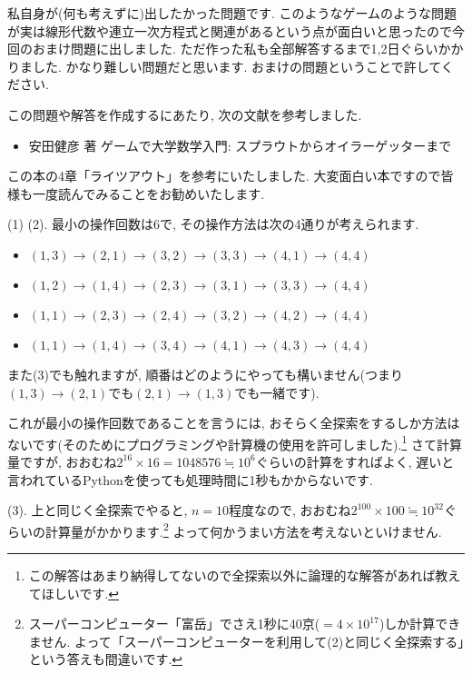 \documentclass[dvipdfmx,a4paper,11pt]{article}
\theoremstyle{definition}
\begin{document}
私自身が(何も考えずに)出したかった問題です. このようなゲームのような問題が実は線形代数や連立一次方程式と関連があるという点が面白いと思ったので今回のおまけ問題に出しました.  ただ作った私も全部解答するまで1,2日ぐらいかかりました. かなり難しい問題だと思います. おまけの問題ということで許してください.

この問題や解答を作成するにあたり, 次の文献を参考しました.
\begin{itemize}
\item 安田健彦 著  ゲームで大学数学入門: スプラウトからオイラーゲッターまで
\end{itemize}
この本の4章「ライツアウト」を参考にいたしました.
大変面白い本ですので皆様も一度読んでみることをお勧めいたします.

(1) (2). 最小の操作回数は6で, その操作方法は次の4通りが考えられます.
\begin{itemize}
\item$(1,3) \rightarrow (2,1) \rightarrow (3,2) \rightarrow (3,3)\rightarrow (4,1)\rightarrow (4,4)$
\item$(1,2) \rightarrow (1,4) \rightarrow (2,3) \rightarrow (3,1)\rightarrow (3,3)\rightarrow (4,4)$
\item$(1,1) \rightarrow (2,3) \rightarrow (2,4) \rightarrow (3,2)\rightarrow (4,2)\rightarrow (4,4)$
\item$(1,1) \rightarrow (1,4) \rightarrow (3,4) \rightarrow (4,1)\rightarrow (4,3)\rightarrow (4,4)$
\end{itemize}
また(3)でも触れますが, 順番はどのようにやっても構いません(つまり$(1,3) \rightarrow (2,1) $でも$(2,1) \rightarrow (1,3) $でも一緒です).

これが最小の操作回数であることを言うには, おそらく全探索をするしか方法はないです(そのためにプログラミングや計算機の使用を許可しました).\footnote{この解答はあまり納得してないので全探索以外に論理的な解答があれば教えてほしいです.}
さて計算量ですが, おおむね$2^{16} \times16 = 1048576 \fallingdotseq 10^{6}$ぐらいの計算をすればよく, 遅いと言われているPythonを使っても処理時間に1秒もかからないです.

(3). 上と同じく全探索でやると, $n=10$程度なので, おおむね$2^{100} \times100\fallingdotseq 10^{32}$ぐらいの計算量がかかります.\footnote{スーパーコンピューター「富岳」でさえ1秒に40京($= 4 \times 10^{17}$)しか計算できません. よって「スーパーコンピューターを利用して(2)と同じく全探索する」という答えも間違いです.}
 よって何かうまい方法を考えないといけません. 
 
\end{document}
